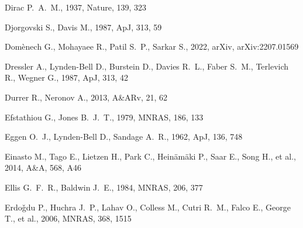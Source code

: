 \documentclass[fleqn,usenatbib]{mnras}
\begin{document}
\begin{thebibliography}{}
  Dirac P.~A.~M., 1937, Nature, 139, 323

 Djorgovski S., Davis M., 1987, ApJ, 313, 59

 Dom{\`e}nech G., Mohayaee R., Patil S.~P., Sarkar S., 2022, arXiv, arXiv:2207.01569

 Dressler A., Lynden-Bell D., Burstein D., Davies R.~L., Faber S.~M., Terlevich R., Wegner G., 1987, ApJ, 313, 42

 Durrer R., Neronov A., 2013, A\&ARv, 21, 62

 Efstathiou G., Jones B.~J.~T., 1979, MNRAS, 186, 133



 Eggen O.~J., Lynden-Bell D., Sandage A.~R., 1962, ApJ, 136, 748

 Einasto M., Tago E., Lietzen H., Park C., Hein{\"a}m{\"a}ki P., Saar E., Song H., et al., 2014, A\&A, 568, A46

 Ellis G.~F.~R., Baldwin J.~E., 1984, MNRAS, 206, 377

 Erdo{\v{g}}du P., Huchra J.~P., Lahav O., Colless M., Cutri R.~M., Falco E., George T., et al., 2006, MNRAS, 368, 1515




\end{thebibliography}
\end{document}
